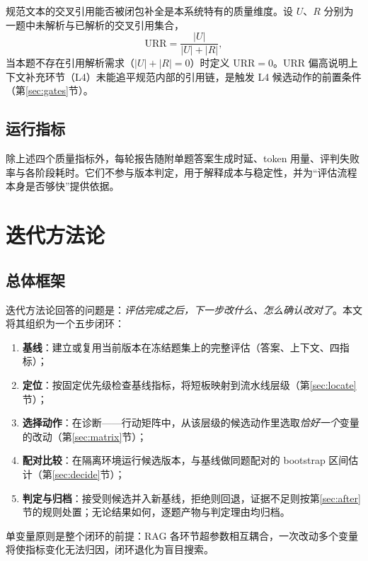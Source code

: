 \documentclass[11pt,a4paper,fontset=fandol]{ctexart}
\begin{document}
规范文本的交叉引用能否被闭包补全是本系统特有的质量维度。设 $U$、$R$ 分别为一题中未解析与已解析的交叉引用集合，
\begin{equation}
  \mathrm{URR}=\frac{|U|}{|U|+|R|},
  \label{eq:urr}
\end{equation}
当本题不存在引用解析需求（$|U|+|R|=0$）时定义 $\mathrm{URR}=0$。URR 偏高说明上下文补充环节（L4）未能追平规范内部的引用链，是触发 L4 候选动作的前置条件（第\ref{sec:gates}节）。

\subsection{运行指标}

除上述四个质量指标外，每轮报告随附单题答案生成时延、token 用量、评判失败率与各阶段耗时。它们不参与版本判定，用于解释成本与稳定性，并为``评估流程本身是否够快''提供依据。

\section{迭代方法论}
\label{sec:iteration}

\subsection{总体框架}

迭代方法论回答的问题是：\emph{评估完成之后，下一步改什么、怎么确认改对了}。本文将其组织为一个五步闭环：

\begin{enumerate}
  \item \textbf{基线}：建立或复用当前版本在冻结题集上的完整评估（答案、上下文、四指标）；
  \item \textbf{定位}：按固定优先级检查基线指标，将短板映射到流水线层级（第\ref{sec:locate}节）；
  \item \textbf{选择动作}：在诊断——行动矩阵中，从该层级的候选动作里选取\emph{恰好一个}变量的改动（第\ref{sec:matrix}节）；
  \item \textbf{配对比较}：在隔离环境运行候选版本，与基线做同题配对的 bootstrap 区间估计（第\ref{sec:decide}节）；
  \item \textbf{判定与归档}：接受则候选并入新基线，拒绝则回退，证据不足则按第\ref{sec:after}节的规则处置；无论结果如何，逐题产物与判定理由均归档。
\end{enumerate}

单变量原则是整个闭环的前提：RAG 各环节超参数相互耦合\cite{wang2024best,ammar2025hyper}，一次改动多个变量将使指标变化无法归因，闭环退化为盲目搜索。
\end{document}
